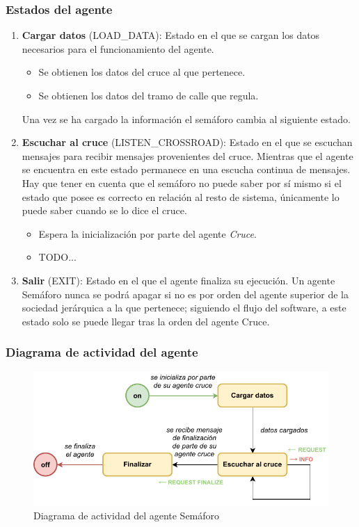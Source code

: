 \subsubsection{Estados del agente}
\begin{enumerate}
    \item \textbf{Cargar datos} \footnotesize(LOAD\_DATA)\normalsize: Estado en el que se cargan los datos necesarios para el funcionamiento del agente.
    \begin{itemize}
        \item Se obtienen los datos del cruce al que pertenece.
        \item Se obtienen los datos del tramo de calle que regula.
    \end{itemize}
    Una vez se ha cargado la información el semáforo cambia al siguiente estado.
    \item \textbf{Escuchar al cruce} \footnotesize(LISTEN\_CROSSROAD)\normalsize: Estado en el que se escuchan mensajes para recibir mensajes provenientes del cruce. Mientras que el agente se encuentra en este estado permanece en una escucha continua de mensajes. Hay que tener en cuenta que el semáforo no puede saber por sí mismo si el estado que posee es correcto en relación al resto de sistema, únicamente lo puede saber cuando se lo dice el cruce.
    \begin{itemize}
        \item Espera la inicialización por parte del agente \textit{Cruce}.
        \item TODO...
    \end{itemize}
    \item \textbf{Salir} \footnotesize(EXIT)\normalsize: Estado en el que el agente finaliza su ejecución. Un agente Semáforo nunca se podrá apagar si no es por orden del agente superior de la sociedad jerárquica a la que pertenece; siguiendo el flujo del software, a este estado solo se puede llegar tras la orden del agente Cruce.
\end{enumerate}

\subsubsection{Diagrama de actividad del agente}
\begin{figure}[H]
    \centering
    \includegraphics[width=1\linewidth]{text/image/DAgen-DA-TrafficLight.pdf}
    \caption{Diagrama de actividad del agente Semáforo}
    \label{fig:da_agente_semaforo}
\end{figure}

